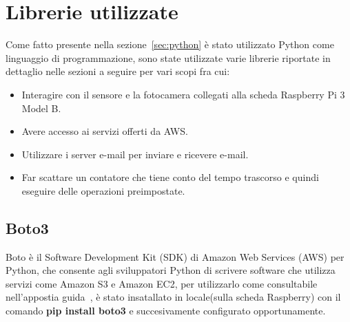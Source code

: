 \section{Librerie utilizzate}
\label{sec:library}
Come fatto presente nella sezione~\ref{sec:python} è stato utilizzato Python come linguaggio di programmazione, sono state utilizzate varie librerie riportate in 
dettaglio nelle sezioni a seguire per vari scopi fra cui:
\begin{itemize}
    \item Interagire con il sensore e la fotocamera collegati alla scheda Raspberry Pi 3 Model B.
    \item Avere accesso ai servizi offerti da AWS.
    \item Utilizzare i server e-mail per inviare e ricevere e-mail.
    \item Far scattare un contatore che tiene conto del tempo trascorso e quindi eseguire delle operazioni preimpostate.
\end{itemize}


\subsection{Boto3}
\label{sec:boto3}
Boto è il Software Development Kit (SDK) di Amazon Web Services (AWS) per Python, che consente agli sviluppatori Python di scrivere software che utilizza servizi 
come Amazon S3 e Amazon EC2, per utilizzarlo come consultabile nell'appostia guida~\cite{boto3}, è stato insatallato in locale(sulla scheda Raspberry) con il comando
\textbf{pip install boto3 } e succesivamente configurato opportunamente.

